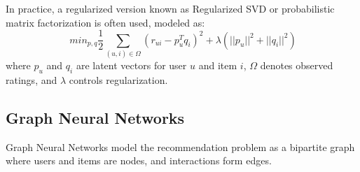 \documentclass[sigconf,nonacm]{acmart} %
\begin{document}
In practice, a regularized version known as Regularized SVD or probabilistic matrix factorization is often used, modeled as:
\begin{equation}
\  min_{p,q} \frac{1} {2} \sum_{(u,i) \in \Omega} (r_{ui} - p_u^T q_i)^2 + \lambda (||p_u||^2 + ||q_i||^2)
\label{eq:regsvd}
\end{equation}
where $p_u$ and $q_i$ are latent vectors for user $u$ and item $i$, $\Omega$ denotes observed ratings, and $\lambda$ controls regularization.

\subsection{Graph Neural Networks}
Graph Neural Networks model the recommendation problem as a bipartite graph where users and items are nodes, and interactions form edges.
\end{document}
